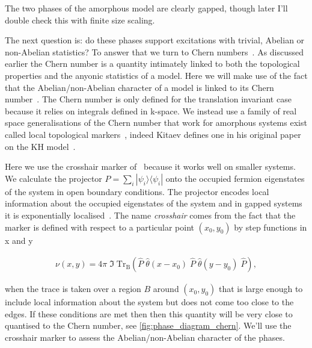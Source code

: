 The two phases of the amorphous model are clearly gapped, though later I'll double check this with finite size scaling.

The next question is: do these phases support excitations with trivial, Abelian or non-Abelian statistics? To answer that we turn to Chern numbers~\autocite{berryQuantalPhaseFactors1984,simonHolonomyQuantumAdiabatic1983,thoulessQuantizedHallConductance1982}. As discussed earlier the Chern number is a quantity intimately linked to both the topological properties and the anyonic statistics of a model. Here we will make use of the fact that the Abelian/non-Abelian character of a model is linked to its Chern number~\autocite{kitaevAnyonsExactlySolved2006}. The Chern number is only defined for the translation invariant case because it relies on integrals defined in k-space. We instead use a family of real space generalisations of the Chern number that work for amorphous systems exist called local topological markers~\autocite{bianco_mapping_2011,Hastings_Almost_2010,mitchellAmorphousTopologicalInsulators2018}, indeed Kitaev defines one in his original paper on the KH model~\autocite{kitaevAnyonsExactlySolved2006}.

Here we use the crosshair marker of~\autocite{peru_preprint} because it works well on smaller systems. We calculate the projector \(P = \sum_i |\psi_i\rangle \langle \psi_i|\) onto the occupied fermion eigenstates of the system in open boundary conditions. The projector encodes local information about the occupied eigenstates of the system and in gapped systems it is exponentially localised~\autocite{hastingsLiebSchultzMattisHigherDimensions2004}. The name \emph{crosshair} comes from the fact that the marker is defined with respect to a particular point \((x_0, y_0)\) by step functions in x and y

\[\begin{aligned}
    \nu (x, y) = 4\pi \; \Im\; \mathrm{Tr}_{\mathrm{B}} 
    \left ( 
    \hat{P}\;\hat{\theta}(x-x_0)\;\hat{P}\;\hat{\theta}(y-y_0)\; \hat{P}
    \right ),
\end{aligned}\]

when the trace is taken over a region \(B\) around \((x_0, y_0)\) that is large enough to include local information about the system but does not come too close to the edges. If these conditions are met then then this quantity will be very close to quantised to the Chern number, see \cref{fig:phase_diagram_chern}. We'll use the crosshair marker to assess the Abelian/non-Abelian character of the phases.

